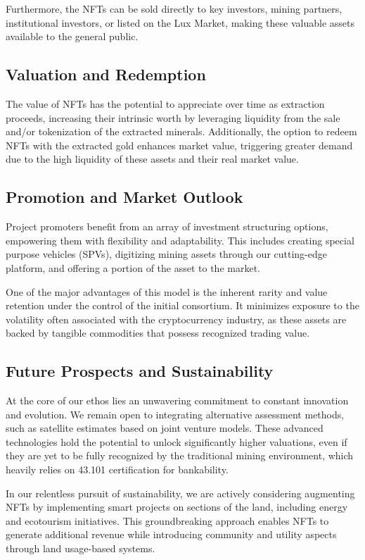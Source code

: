 \documentclass[11pt]{article}
\begin{document}
Furthermore, the NFTs can be sold directly to key investors, mining partners, institutional investors, or listed on the Lux Market, making these valuable assets available to the general public.


\subsection{Valuation and Redemption}

The value of NFTs has the potential to appreciate over time as extraction proceeds, increasing their intrinsic worth by leveraging liquidity from the sale and/or tokenization of the extracted minerals. Additionally, the option to redeem NFTs with the extracted gold enhances market value, triggering greater demand due to the high liquidity of these assets and their real market value.


\subsection{Promotion and Market Outlook}

Project promoters benefit from an array of investment structuring options, empowering them with flexibility and adaptability. This includes creating special purpose vehicles (SPVs), digitizing mining assets through our cutting-edge platform, and offering a portion of the asset to the market.


One of the major advantages of this model is the inherent rarity and value retention under the control of the initial consortium. It minimizes exposure to the volatility often associated with the cryptocurrency industry, as these assets are backed by tangible commodities that possess recognized trading value.


\subsection{Future Prospects and Sustainability}

At the core of our ethos lies an unwavering commitment to constant innovation and evolution. We remain open to integrating alternative assessment methods, such as satellite estimates based on joint venture models. These advanced technologies hold the potential to unlock significantly higher valuations, even if they are yet to be fully recognized by the traditional mining environment, which heavily relies on 43.101 certification for bankability.


In our relentless pursuit of sustainability, we are actively considering augmenting NFTs by implementing smart projects on sections of the land, including energy and ecotourism initiatives. This groundbreaking approach enables NFTs to generate additional revenue while introducing community and utility aspects through land usage-based systems.
\end{document}
